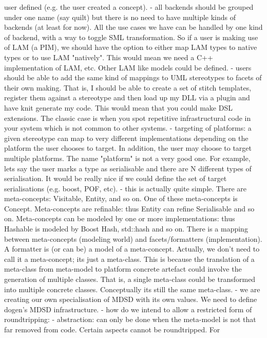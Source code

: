 \documentclass{book}
\begin{document}
  user defined (e.g. the user created a concept).
- all backends should be grouped under one name (say quilt) but there
  is no need to have multiple kinds of backends (at least for
  now). All the use cases we have can be handled by one kind of
  backend, with a way to toggle SML transformation. So if a user is
  making use of LAM (a PIM), we should have the option to either map
  LAM types to native types or to use LAM "natively". This would mean
  we need a C++ implementation of LAM, etc. Other LAM like models
  could be defined.
- users should be able to add the same kind of mappings to UML
  stereotypes to facets of their own making. That is, I should be able
  to create a set of stitch templates, register them against a
  stereotype and then load up my DLL via a plugin and have knit
  generate my code. This would mean that you could make DSL
  extensions. The classic case is when you spot repetitive
  infrastructural code in your system which is not common to other
  systems.
- targeting of platforms: a given stereotype can map to very different
  implementations depending on the platform the user chooses to
  target. In addition, the user may choose to target multiple
  platforms. The name "platform" is not a very good one. For example,
  lets say the user marks a type as serialisable and there are N
  different types of serialisation. It would be really nice if we
  could define the set of target serialisations (e.g. boost, POF,
  etc).
- this is actually quite simple. There are meta-concepts: Visitable,
  Entity, and so on. One of these meta-concepts is
  Concept. Meta-concepts are refinable: thus Entity can refine
  Serialisable and so on. Meta-concepts can be modeled by one or
  more implementations: thus Hashable is modeled by Boost Hash,
  std::hash and so on. There is a mapping between meta-concepts
  (modeling world) and facets/formatters (implementation). A formatter
  is (or can be) a model of a meta-concept. Actually, we don't need to
  call it a meta-concept; its just a meta-class. This is because the
  translation of a meta-class from meta-model to platform concrete
  artefact could involve the generation of multiple classes. That is,
  a single meta-class could be transformed into multiple concrete
  classes. Conceptually its still the same meta-class.
- we are creating our own specialisation of MDSD with its own
  values. We need to define dogen's MDSD infrastructure.
- how do we intend to allow a restricted form of roundtripping:
  - abstraction: can only be done when the meta-model is not that far
    removed from code. Certain aspects cannot be roundtripped. For
\end{document}
